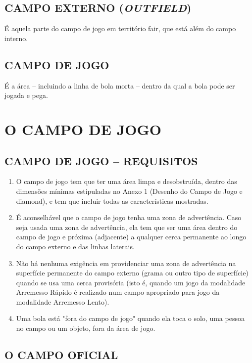 \subsection{CAMPO EXTERNO (\textit{OUTFIELD})}
É aquela parte do campo de jogo em território \gls{fair}, que está além do campo interno.

\subsection{CAMPO DE JOGO}
É a área -- incluindo a linha de bola morta -- dentro da qual a bola pode ser jogada  e pega.
\section{O CAMPO DE JOGO}

\subsection{CAMPO DE JOGO -- REQUISITOS}

\begin{enumerate}[label=(\alph*)]
	\item O campo de jogo tem que ter uma área limpa e desobstruída, dentro das dimensões mínimas estipuladas no Anexo 1 (Desenho do Campo de Jogo e \gls{diamond}), e tem que incluir todas as características mostradas.

	\item É aconselhável que o campo de jogo tenha uma zona de advertência. Caso seja usada uma zona de advertência, ela tem que ser uma área dentro do campo de jogo e próxima (adjacente) a qualquer cerca permanente ao longo do campo externo e das linhas laterais.

	\item Não há nenhuma exigência em providenciar uma zona de advertência na  superfície permanente do campo externo (grama ou outro tipo de superfície) quando se usa uma cerca provisória (isto é, quando um jogo da modalidade Arremesso Rápido é realizado num campo apropriado para jogo da modalidade Arremesso Lento).

	\item Uma bola está "fora do campo de jogo" quando ela toca o solo, uma pessoa  no campo ou um objeto, fora da área de jogo.
\end{enumerate}

\subsection{O CAMPO OFICIAL}

